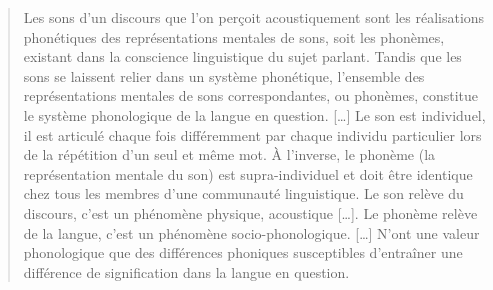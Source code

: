 \begin{quote}\small
Les sons d’un discours que l’on perçoit acoustiquement sont les réalisations phonétiques des représentations mentales de sons, soit les phonèmes, existant dans la conscience linguistique du sujet parlant. Tandis que les sons se laissent relier dans un système phonétique, l’ensemble des représentations mentales de sons correspondantes, ou phonèmes, constitue le système phonologique de la langue en question. […] Le son est individuel, il est articulé chaque fois différemment par chaque individu particulier lors de la répétition d’un seul et même mot. À l’inverse, le phonème (la représentation mentale du son) est supra-individuel et doit être identique chez tous les membres d’une communauté linguistique. Le son relève du discours, c’est un phénomène physique, acoustique […]. Le phonème relève de la langue, c’est un phénomène socio-phonologique. […] N’ont une valeur phonologique que des différences phoniques susceptibles d’entraîner une différence de signification dans la langue en question.
\end{quote}

